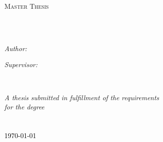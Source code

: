 \documentclass[
11pt, %
english, %
doublespacing, %
nolistspacing, %
parskip, %
headsepline, %
the default layout
]{MastersDoctoralThesis} %
\author{Nadin-Katrin \textsc{Apel}} %
\begin{document}
\frontmatter %

\pagestyle{plain} %


\begin{titlepage}
\begin{center}

\vspace*{.06\textheight}
{\scshape\LARGE \univname\par}\vspace{1.5cm} %
\textsc{\Large Master Thesis}\\[0.5cm] %

\HRule \\[0.4cm] %
{\huge \bfseries \ttitle\par}\vspace{0.4cm} %
\HRule \\[1.5cm] %

\begin{minipage}[t]{0.4\textwidth}
\begin{flushleft} \large
\emph{Author:}\\
\href{http://nadin-katrin.de/}{\authorname} %
\end{flushleft}
\end{minipage}
\begin{minipage}[t]{0.4\textwidth}
\begin{flushright} \large
\emph{Supervisor:} \\
\href{https://www.hdm-stuttgart.de/csm/studiengang/team/professoren}{\supname} %
\end{flushright}
\end{minipage}\\[2.2cm]

\vfill

\large \textit{A thesis submitted in fulfillment of the requirements\\ for the degree }\\[0.2cm] %
\huge \degreename\\[0.6cm]
\large \deptname\\[0.2cm]
\vfill
\textcolor{black}{\large \today}\\ %

\vfill
\end{center}
\end{titlepage}
\end{document}
